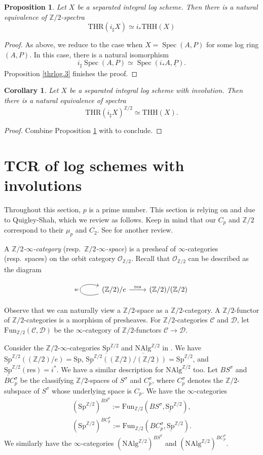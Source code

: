 \documentclass[10pt]{amsart}
\newtheorem{prop}[thm]{Proposition}
\newtheorem{cor}[thm]{Corollary}
\theoremstyle{definition}
\theoremstyle{remark}
\numberwithin{equation}{section}
\newcommand{\Z}{\mathbb{Z}}
\newcommand{\cC}{\mathcal{C}}
\newcommand{\cD}{\mathcal{D}}
\newcommand{\cO}{\mathcal{O}}
\DeclareMathOperator{\Spec}{Spec}
\newcommand{\ul}{\underline}
\newcommand{\Sp}{\mathrm{Sp}}
\newcommand{\NAlg}{\mathrm{NAlg}}
\newcommand{\Fun}{\mathrm{Fun}}
\newcommand{\THH}{\mathrm{THH}}
\newcommand{\THR}{\mathrm{THR}}
\newcommand{\Ztwo}{{\mathbb{Z}/2}}
\begin{document}
\begin{prop}
\label{descent.12}
Let $X$ be a separated integral log scheme.
Then there is a natural equivalence of $\Ztwo$-spectra
\[
\THR(i_\sharp X)
\simeq
i_*\THH(X)
\]
\end{prop}
\begin{proof}
As above,
we reduce to the case when $X=\Spec(A,P)$ for some log ring $(A,P)$.
In this case,
there is a natural isomorphism
\[
i_\sharp \Spec(A,P)
\simeq
\Spec(i_* A,\ul{P}).
\]
Proposition \ref{thrlog.3} finishes the proof.
\end{proof}

\begin{cor}
\label{descent.13}
Let $X$ be a separated integral log scheme with involution.
Then there is a natural equivalence of spectra
\[
\THR(i_\sharp X)^{\Z/2}
\simeq
\THH(X).
\]
\end{cor}
\begin{proof}
Combine Proposition \ref{descent.12} with \cite[Proposition A.2.7(2)]{THR} to conclude.
\end{proof}


\section{TCR of log schemes with involutions}
\label{TCR}

Throughout this section,
$p$ is a prime number.
This section is relying on  \cite{QS1} and \cite{QS2} due to Quigley-Shah,
which we review as follows.
Keep in mind that our $C_p$ and $\Ztwo$ correspond to their $\mu_p$ and $C_2$.
See \cite[\S 3]{synTCR} for another review.


A \emph{$\Z/2$-$\infty$-category} (resp.\ \emph{$\Z/2$-$\infty$-space}) is a presheaf of $\infty$-categories (resp.\ spaces) on the orbit category $\cO_{\Z/2}$.
Recall that $\cO_{\Z/2}$ can be described as the diagram
\[
\begin{tikzcd}
(\Z/2)/e\ar[loop left,"w"]\ar[r,"\mathrm{res}"]&
(\Z/2)/(\Z/2)
\end{tikzcd}
\]
Observe that we can naturally view a $\Z/2$-space as a $\Z/2$-category.
A $\Z/2$-functor of $\Z/2$-categories is a morphism of presheaves.
For $\Z/2$-categories $\cC$ and $\cD$,
let $\Fun_{\Z/2}(\cC,\cD)$ be the $\infty$-category of $\Z/2$-functors $\cC\to \cD$.

Consider the $\Z/2$-$\infty$-categories $\ul{\Sp}^{\Z/2}$ and $\ul{\NAlg}^{\Z/2}$ in \cite[Example 3.2]{synTCR}.
We have $\ul{\Sp}^{\Z/2}((\Z/2)/e)=\Sp$, $\ul{\Sp}^{\Z/2}((\Z/2)/(\Z/2))=\Sp^{\Z/2}$, and $\ul{\Sp}^{\Z/2}(\mathrm{res})=i^*$.
We have a similar description for $\NAlg^{\Z/2}$ too.
Let $BS^\sigma$ and $BC_p^\sigma$ be the classifying $\Z/2$-spaces of $S^\sigma$ and $C_p^\sigma$,
where $C_p^\sigma$ denotes the $\Z/2$-subspace of $S^\sigma$ whose underlying space is $C_p$.
We have the $\infty$-categories
\begin{gather*}
(\Sp^{\Z/2})^{BS^\sigma}
:=
\Fun_{\Z/2}(
BS^\sigma,
\ul{\Sp}^{\Z/2}
),
\\
(\Sp^{\Z/2})^{BC_p^\sigma}
:=
\Fun_{\Z/2}(
BC_p^\sigma,
\ul{\Sp}^{\Z/2}
).
\end{gather*}
We similarly have the $\infty$-categories $(\NAlg^{\Z/2})^{BS^\sigma}$ and $(\NAlg^{\Z/2})^{BC_p^\sigma}$.
\end{document}
